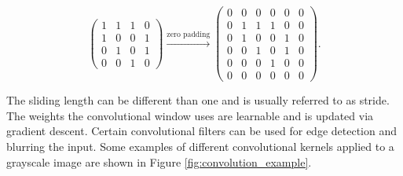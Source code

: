 \begin{description}
        \begin{equation}
            \begin{pmatrix}
                1 & 1 & 1 & 0 \\
                1 & 0 & 0 & 1 \\
                0 & 1 & 0 & 1 \\
                0 & 0 & 1 & 0
            \end{pmatrix} \xrightarrow{\text{zero padding}}
            \begin{pmatrix}
                0 & 0 & 0 & 0 & 0 & 0 \\
                0 & 1 & 1 & 1 & 0 & 0 \\
                0 & 1 & 0 & 0 & 1 & 0 \\
                0 & 0 & 1 & 0 & 1 & 0 \\
                0 & 0 & 0 & 1 & 0 & 0 \\
                0 & 0 & 0 & 0 & 0 & 0
            \end{pmatrix}.
        \end{equation}

        The sliding length can be different than one and is usually referred
        to as stride. The weights the convolutional window uses are learnable
        and is updated via gradient descent. Certain convolutional filters can
        be used for edge detection and blurring the input. Some examples of
        different convolutional kernels applied to a grayscale image are shown
        in Figure \ref{fig:convolution_example}.


\end{description}
